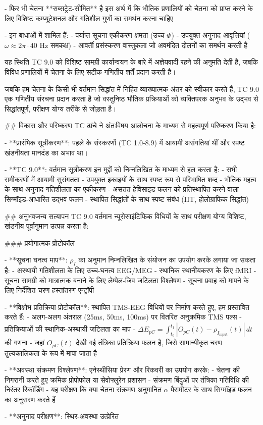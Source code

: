 - फिर भी चेतना **सब्सट्रेट-सीमित** है इस अर्थ में कि भौतिक प्रणालियों को चेतना को प्राप्त करने के लिए विशिष्ट कम्प्यूटेशनल और गतिशील गुणों का समर्थन करना चाहिए
    
- इन बाधाओं में शामिल हैं:
  - पर्याप्त सूचना एकीकरण क्षमता (उच्च $\Phi$)
  - उपयुक्त अनुनाद आवृत्तियां ($\omega \approx 2\pi \cdot 40$ Hz समकक्ष)
  - आवर्ती प्रसंस्करण वास्तुकला जो अवमंदित दोलनों का समर्थन करती है

यह स्थिति TC 9.0 को विशिष्ट सामग्री कार्यान्वयन के बारे में अज्ञेयवादी रहने की अनुमति देती है, जबकि विविध प्रणालियों में चेतना के लिए सटीक गणितीय शर्तें प्रदान करती है।

जबकि हम चेतना के किसी भी वर्तमान सिद्धांत में निहित व्याख्यात्मक अंतर को स्वीकार करते हैं, TC 9.0 एक गणितीय संरचना प्रदान करता है जो वस्तुनिष्ठ भौतिक प्रक्रियाओं को व्यक्तिपरक अनुभव के उद्भव से सिद्धांतपूर्ण, परीक्षण योग्य तरीके से जोड़ता है।

## विकास और परिष्करण
TC ढांचे ने अंतःविषय आलोचना के माध्यम से महत्वपूर्ण परिष्करण किया है:

- **प्रारंभिक सूत्रीकरण**: पहले के संस्करणों (TC 1.0-8.9) में आयामी असंगतियां थीं और स्पष्ट खंडनीयता मानदंड का अभाव था।
    
- **TC 9.0**: वर्तमान सूत्रीकरण इन मुद्दों को निम्नलिखित के माध्यम से हल करता है:
  - सभी समीकरणों में आयामी सुसंगतता
  - उपयुक्त इकाइयों के साथ स्पष्ट रूप से परिभाषित शब्द
  - भौतिक महत्व के साथ अनुनाद गतिशीलता का एकीकरण
  - असतत हेविसाइड फलन को प्रतिस्थापित करने वाला सिग्मॉइड-आधारित उद्भव फलन
  - स्थापित सिद्धांतों के साथ स्पष्ट संबंध (IIT, होलोग्राफिक सिद्धांत)

## अनुभवजन्य सत्यापन
TC 9.0 वर्तमान न्यूरोसाइंटिफिक विधियों के साथ परीक्षण योग्य विशिष्ट, खंडनीय पूर्वानुमान उत्पन्न करता है:

### प्रयोगात्मक प्रोटोकॉल

- **सूचना घनत्व माप**: $\rho_I$ का अनुमान निम्नलिखित के संयोजन का उपयोग करके लगाया जा सकता है:
  - अस्थायी गतिशीलता के लिए उच्च-घनत्व EEG/MEG
  - स्थानिक स्थानीयकरण के लिए fMRI
  - सूचना सामग्री को मात्रात्मक बनाने के लिए लेम्पेल-ज़िव जटिलता विश्लेषण
  - सूचना प्रवाह को मापने के लिए निर्देशित चरण हस्तांतरण एन्ट्रॉपी
    
- **विक्षोभ प्रतिक्रिया प्रोटोकॉल**: स्थापित TMS-EEG विधियों पर निर्माण करते हुए, हम प्रस्तावित करते हैं:
  - अलग-अलग अंतराल (25ms, 50ms, 100ms) पर वितरित अनुक्रमिक TMS पल्स
  - प्रतिक्रियाओं की स्थानिक-अस्थायी जटिलता का माप
  - $\Delta E_{pC} = \int_{t_0}^{t_1} |O_{pC}(t) - \rho_{I_{\text{input}}}(t)| \, dt$ की गणना
  - जहां $O_{pC}(t)$ देखी गई तंत्रिका प्रतिक्रिया फलन है, जिसे सामान्यीकृत चरण तुल्यकालिकता के रूप में मापा जाता है
    
- **अवस्था संक्रमण विश्लेषण**: एनेस्थीसिया प्रेरण और रिकवरी का उपयोग करके:
  - चेतना की निगरानी करते हुए क्रमिक प्रोपोफोल या सेवोफ्लुरेन प्रशासन
  - संक्रमण बिंदुओं पर तंत्रिका गतिविधि की निरंतर रिकॉर्डिंग
  - यह परीक्षण कि क्या चेतना संक्रमण अनुमानित $\alpha$ पैरामीटर के साथ सिग्मॉइड फलन का अनुसरण करते हैं
    
- **अनुनाद परीक्षण**: स्थिर-अवस्था उत्प्रेरित